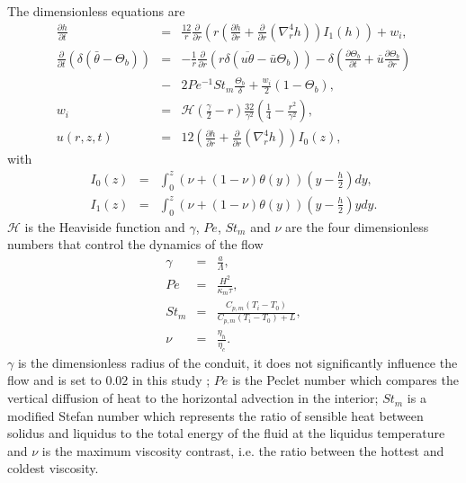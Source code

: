 The dimensionless equations are
\begin{eqnarray}
  \frac{\partial h}{\partial t}& =& \frac{12}{r}
                                    \frac{\partial}{\partial r} \left( r\left( \frac{\partial h}{\partial      r}+\frac{\partial}{\partial      r}\left(\nabla_r^4h\right)\right)I_1(h)\right)
                                    + w_i\label{C3-EqFinal1},\\
  \frac{\partial}{\partial
  t}\left( \delta( \bar{\theta}-\Theta_b)\right)&=&-\frac{1}{r}\frac{\partial}{\partial
                                                    r}  \left(   r\delta(\overline{u\theta}-\bar{u}\Theta_b)\right)  -
                                                    \delta\left(      \frac{\partial       \Theta_b}{\partial      t}+
                                                    \overline{u}\frac{\partial     \Theta_b}{\partial    r}\right)\nonumber\\
                               &-&
                                   2Pe^{-1}St_m\frac{\Theta_b}{\delta}+\frac{w_{i}}{2}(1-\Theta_b)\label{C3-HeatDimensionLess},\\
  w_{i}&=&\mathcal{H}(\frac{\gamma}{2}-r)
           \frac{32}{\gamma^{2}}\left(\frac{1}{4}-\frac{r^{2}}{\gamma^{2}}\right),\\
  u(r,z,t)&   =&   12\left(   \frac{\partial   h}{\partial
                 r}+\frac{\partial}{\partial
                 r}\left(\nabla_r^4h\right)\right)I_0(z)\label{C3-Veloc},
\end{eqnarray}
with
\begin{eqnarray}
  I_0(z)&=&\int_0^z \left(\nu+(1-\nu)\theta(y)\right)\left(y-\frac{h}{2}\right)
            dy \label{C3-I_1},\\
  I_1(z) &=& \int_0^z \left(\nu+(1-\nu)\theta(y)\right)\left(y-\frac{h}{2}\right)y dy\label{C3-I_2}.
\end{eqnarray}
$\mathcal{H}$ is the Heaviside function and $\gamma$, $Pe$, $St_m$ and
$\nu$ are the four dimensionless  numbers that control the dynamics of
the flow
\begin{eqnarray}
  \gamma&=&\frac{a}{\Lambda} \label{C3-gamma},\\
  Pe&=&            \frac{H^2}{\kappa_m            \tau}\label{C3-Pe},\\
  St_m &=& \frac{C_{p,m}\left(T_i-T_0\right)}{C_{p,m}\left(T_i-T_0\right)+L} \label{C3-St},\\
  \nu&=& \frac{\eta_h}{\eta_c}\label{C3-nu}.
\end{eqnarray}
$\gamma$  is the  dimensionless radius  of  the conduit,  it does  not
significantly influence  the flow and is  set to $0.02$ in  this study
\citep{Michaut:2009jx,Michaut:2011kg}; $Pe$ is the Peclet number which
compares the vertical diffusion of heat to the horizontal advection in
the interior; $St_m$ is a  modified Stefan number which represents the
ratio  of sensible  heat between  solidus  and liquidus  to the  total
energy  of the  fluid at  the liquidus  temperature and  $\nu$ is  the
maximum viscosity  contrast, i.e.  the  ratio between the  hottest and
coldest viscosity.

